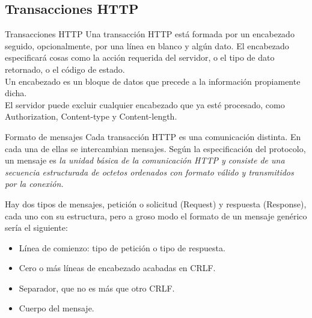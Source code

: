 \subsection{Transacciones HTTP} %

\begin{frame}{Transacciones HTTP} %
    Una transacción HTTP está formada por un encabezado seguido, opcionalmente,
    por una línea en blanco y algún dato. El encabezado especificará cosas como
    la acción requerida del servidor, o el tipo de dato retornado, o el código
    de estado. \\[0.5cm]

    Un encabezado es un bloque de datos que precede a la información
    propiamente dicha. \\[0.5cm]

    El servidor puede excluir cualquier encabezado que ya esté procesado, como
    Authorization, Content-type y Content-length. \\[0.5cm]
\end{frame}

\begin{frame}{Formato de mensajes} %
    Cada transacción HTTP es una comunicación distinta. En cada una de ellas se
    intercambian mensajes. Según la especificación del protocolo, un mensaje es
    \textit{la unidad básica de la comunicación HTTP y consiste de una
    secuencia estructurada de octetos ordenados con formato válido y
    transmitidos por la conexión.}

    Hay dos tipos de mensajes, petición o solicitud (Request) y respuesta
    (Response), cada uno con su estructura, pero a groso modo el formato de un
    mensaje genérico sería el siguiente: 

\begin{itemize}
	\item Línea de comienzo: tipo de petición o tipo de respuesta.
	\item Cero o más líneas de encabezado acabadas en CRLF.
	\item Separador, que no es más que otro CRLF.
	\item Cuerpo del mensaje.
\end{itemize}
\end{frame}

